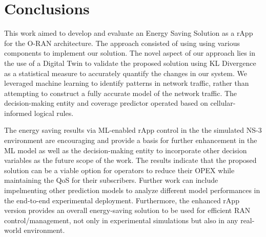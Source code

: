 \section{Conclusions}
This work aimed to develop and evaluate an Energy Saving Solution as a rApp for the O-RAN architecture. 
The approach consisted of using using various components to implement our solution.
The novel aspect of our approach lies in the use of a Digital Twin to validate the proposed solution using KL Divergence as a statistical measure to accurately quantify the changes in our system.
We leveraged machine learning to identify patterns in network traffic, rather than attempting to construct a fully accurate model of the network traffic.
The decision-making entity and coverage predictor operated based on cellular-informed logical rules.

The energy saving results via ML-enabled rApp control in the the simulated NS-3 environment are encouraging and provide a basis for further enhancement in the ML model as well as the decision-making entity to incorporate other decision variables as the future scope of the work. 
The results indicate that the proposed solution can be a viable option for operators to reduce their OPEX while maintaining the QoS for their subscribers.
Further work can include impelmenting other prediction models to analyze different model performances in the end-to-end experimental deployment. 
Furthermore, the enhanced rApp version provides an overall energy-saving solution to be used for efficient RAN control/management, not only in experimental simulations but also in any real-world environment.
